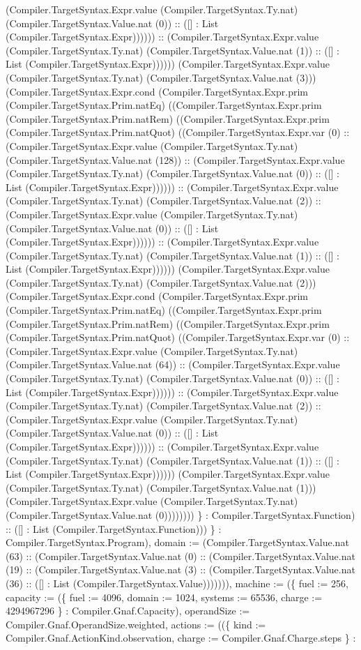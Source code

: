 \documentclass[11pt]{article}
\begin{document}
(Compiler.TargetSyntax.Expr.value (Compiler.TargetSyntax.Ty.nat) (Compiler.TargetSyntax.Value.nat (0)) :: ([] : List (Compiler.TargetSyntax.Expr)))))) :: (Compiler.TargetSyntax.Expr.value (Compiler.TargetSyntax.Ty.nat) (Compiler.TargetSyntax.Value.nat (1)) :: ([] : List (Compiler.TargetSyntax.Expr)))))) (Compiler.TargetSyntax.Expr.value (Compiler.TargetSyntax.Ty.nat) (Compiler.TargetSyntax.Value.nat (3))) (Compiler.TargetSyntax.Expr.cond (Compiler.TargetSyntax.Expr.prim (Compiler.TargetSyntax.Prim.natEq) ((Compiler.TargetSyntax.Expr.prim (Compiler.TargetSyntax.Prim.natRem) ((Compiler.TargetSyntax.Expr.prim (Compiler.TargetSyntax.Prim.natQuot) ((Compiler.TargetSyntax.Expr.var (0) :: (Compiler.TargetSyntax.Expr.value (Compiler.TargetSyntax.Ty.nat) (Compiler.TargetSyntax.Value.nat (128)) :: (Compiler.TargetSyntax.Expr.value (Compiler.TargetSyntax.Ty.nat) (Compiler.TargetSyntax.Value.nat (0)) :: ([] : List (Compiler.TargetSyntax.Expr)))))) :: (Compiler.TargetSyntax.Expr.value (Compiler.TargetSyntax.Ty.nat) (Compiler.TargetSyntax.Value.nat (2)) :: (Compiler.TargetSyntax.Expr.value (Compiler.TargetSyntax.Ty.nat) (Compiler.TargetSyntax.Value.nat (0)) :: ([] : List (Compiler.TargetSyntax.Expr)))))) :: (Compiler.TargetSyntax.Expr.value (Compiler.TargetSyntax.Ty.nat) (Compiler.TargetSyntax.Value.nat (1)) :: ([] : List (Compiler.TargetSyntax.Expr)))))) (Compiler.TargetSyntax.Expr.value (Compiler.TargetSyntax.Ty.nat) (Compiler.TargetSyntax.Value.nat (2))) (Compiler.TargetSyntax.Expr.cond (Compiler.TargetSyntax.Expr.prim (Compiler.TargetSyntax.Prim.natEq) ((Compiler.TargetSyntax.Expr.prim (Compiler.TargetSyntax.Prim.natRem) ((Compiler.TargetSyntax.Expr.prim (Compiler.TargetSyntax.Prim.natQuot) ((Compiler.TargetSyntax.Expr.var (0) :: (Compiler.TargetSyntax.Expr.value (Compiler.TargetSyntax.Ty.nat) (Compiler.TargetSyntax.Value.nat (64)) :: (Compiler.TargetSyntax.Expr.value (Compiler.TargetSyntax.Ty.nat) (Compiler.TargetSyntax.Value.nat (0)) :: ([] : List (Compiler.TargetSyntax.Expr)))))) :: (Compiler.TargetSyntax.Expr.value (Compiler.TargetSyntax.Ty.nat) (Compiler.TargetSyntax.Value.nat (2)) :: (Compiler.TargetSyntax.Expr.value (Compiler.TargetSyntax.Ty.nat) (Compiler.TargetSyntax.Value.nat (0)) :: ([] : List (Compiler.TargetSyntax.Expr)))))) :: (Compiler.TargetSyntax.Expr.value (Compiler.TargetSyntax.Ty.nat) (Compiler.TargetSyntax.Value.nat (1)) :: ([] : List (Compiler.TargetSyntax.Expr)))))) (Compiler.TargetSyntax.Expr.value (Compiler.TargetSyntax.Ty.nat) (Compiler.TargetSyntax.Value.nat (1))) (Compiler.TargetSyntax.Expr.value (Compiler.TargetSyntax.Ty.nat) (Compiler.TargetSyntax.Value.nat (0)))))))) \} : Compiler.TargetSyntax.Function) :: ([] : List (Compiler.TargetSyntax.Function))) \} : Compiler.TargetSyntax.Program), domain := (Compiler.TargetSyntax.Value.nat (63) :: (Compiler.TargetSyntax.Value.nat (0) :: (Compiler.TargetSyntax.Value.nat (19) :: (Compiler.TargetSyntax.Value.nat (3) :: (Compiler.TargetSyntax.Value.nat (36) :: ([] : List (Compiler.TargetSyntax.Value))))))), machine := (\{ fuel := 256, capacity := (\{ fuel := 4096, domain := 1024, systems := 65536, charge := 4294967296 \} : Compiler.Gnaf.Capacity), operandSize := Compiler.Gnaf.OperandSize.weighted, actions := ((\{ kind := Compiler.Gnaf.ActionKind.observation, charge := Compiler.Gnaf.Charge.steps \} : 
\end{document}
